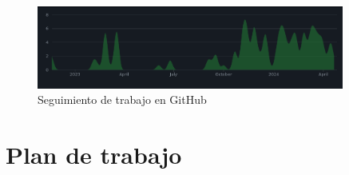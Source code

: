 \begin{figure} [H]
    \begin{center}
      \includegraphics[width=0.9\textwidth,height=0.3\textwidth]{figs/objetivos/github.png}
    \end{center}
    \caption{Seguimiento de trabajo en GitHub}
    \label{fig:github}
  \end{figure}


\section{Plan de trabajo}
\label{sec:plantrabajo}

